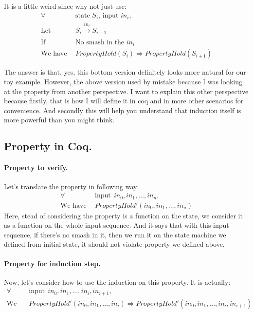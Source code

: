 \documentclass{article}
\begin{document}
It is a little weird since why not just use:
\begin{align*}
\forall &~~ \text{state $S_i$, input $in_i$}, \\
\text{Let} &~~ S_i \xrightarrow[]{in_i} S_{i+1} \\
\text{If} &~~ \text{No smash in the $in_i$} \\
\text{We have} &~~ PropertyHold(S_{i}) \Rightarrow PropertyHold(S_{i+1})
\end{align*}

The answer is that, yes, this bottom version definitely looks more natural for our toy example.
However, the above version used by mistake because I was looking at the property from another perspective.
I want to explain this other perspective because firstly, that is how I will define it in coq and in more other scenarios for convenience.
And secondly this will help you understand that induction itself is more powerful than you might think.




\subsection{Property in Coq.}

\paragraph{Property to verify.}
Let's translate the property in following way:
\begin{align*}
\forall &~~ \text{input} ~~ in_0, in_1, \dots, in_n, \\
\text{We have} &~~ PropertyHold'(in_0, in_1, \dots, in_n)
\end{align*}
Here, stead of considering the property is a function on the state, we consider it as a function on the whole input sequence.
And it says that with this input sequence, if there's no smash in it, then we run it on the state machine we defined from initial state, it should not violate property we defined above.




\paragraph{Property for induction step.}
Now, let's consider how to use the induction on this property.
It is actually:
\begin{align*}
\forall &~~ \text{input} ~~ in_0, in_1, \dots, in_i, in_{i+1}, \\
\text{We have} &~~ PropertyHold'(in_0, in_1, \dots, in_i) \Rightarrow PropertyHold'(in_0, in_1, \dots, in_i, in_{i+1})
\end{align*}
\end{document}
